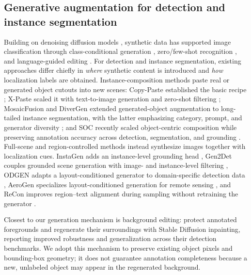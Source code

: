\documentclass[preprint,12pt,authoryear]{elsarticle}
\begin{document}
\subsection{Generative augmentation for detection and instance segmentation}
Building on denoising diffusion models \citep{ho2020ddpm,
rombach2022ldm}, synthetic data has supported image classification
through class-conditional generation \citep{azizi2023synthetic},
zero/few-shot recognition \citep{he2023synthetic}, and language-guided
editing \citep{trabucco2024dafusion, dunlap2023alia}. For detection and
instance segmentation, existing approaches differ chiefly in
\emph{where} synthetic content is introduced and \emph{how} localization
labels are obtained. Instance-composition methods paste real or generated
object cutouts into new scenes: Copy-Paste established the basic recipe
\citep{ghiasi2021copy}; X-Paste scaled it with text-to-image generation
and zero-shot filtering \citep{zhao2023xpaste}; MosaicFusion and DiverGen
extended generated-object augmentation to long-tailed instance
segmentation, with the latter emphasizing category, prompt, and generator
diversity \citep{xie2025mosaicfusion, fan2024divergen}; and SOC recently
scaled object-centric composition while preserving annotation accuracy
across detection, segmentation, and grounding \citep{huang2026soc}.
Full-scene and region-controlled methods
instead synthesize images together with localization cues. InstaGen adds
an instance-level grounding head \citep{feng2024instagen}, Gen2Det couples
grounded scene generation with image- and instance-level filtering
\citep{suri2024gen2det}, ODGEN adapts a layout-conditioned generator to
domain-specific detection data \citep{zhu2024odgen}, AeroGen specializes
layout-conditioned generation for remote sensing
\citep{tang2025aerogen}, and ReCon improves region--text alignment during
sampling without retraining the generator \citep{zhu2025recon}.

Closest to our generation mechanism is background editing:
\citet{li2024background} protect annotated foregrounds and regenerate
their surroundings with Stable Diffusion inpainting, reporting improved
robustness and generalization across their detection benchmarks. We adopt
this mechanism to preserve existing object pixels and bounding-box
geometry; it does not guarantee annotation completeness because a new,
unlabeled object may appear in the regenerated background.
\end{document}
